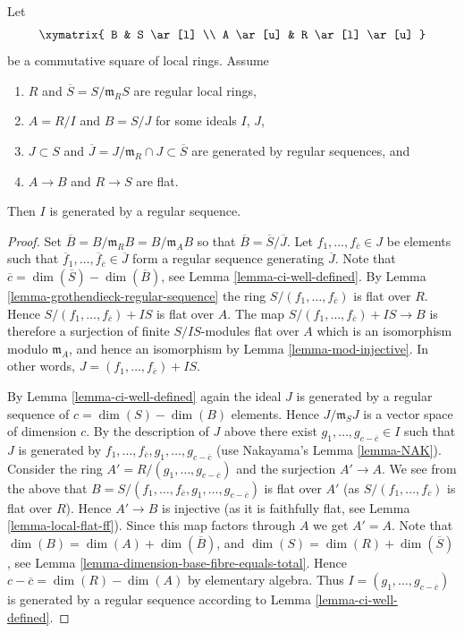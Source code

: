 \begin{lemma}
\label{lemma-lci-permanence-initial}
Let
$$
\xymatrix{
B & S \ar[l] \\
A \ar[u] & R \ar[l] \ar[u]
}
$$
be a commutative square of local rings. Assume
\begin{enumerate}
\item $R$ and $\overline{S} = S/\mathfrak m_R S$ are regular local rings,
\item $A = R/I$ and $B = S/J$ for some ideals $I$, $J$,
\item $J \subset S$ and
$\overline{J} = J/\mathfrak m_R \cap J \subset \overline{S}$
are generated by regular sequences, and
\item $A \to B$ and $R \to S$ are flat.
\end{enumerate}
Then $I$ is generated by a regular sequence.
\end{lemma}

\begin{proof}
Set $\overline{B} = B/\mathfrak m_RB = B/\mathfrak m_AB$ so that
$\overline{B} = \overline{S}/\overline{J}$.
Let $f_1, \ldots, f_{\overline{c}} \in J$ be elements such that
$\overline{f}_1, \ldots, \overline{f}_{\overline{c}} \in \overline{J}$
form a regular sequence generating $\overline{J}$.
Note that $\overline{c} = \dim(\overline{S}) - \dim(\overline{B})$,
see Lemma \ref{lemma-ci-well-defined}.
By Lemma \ref{lemma-grothendieck-regular-sequence}
the ring $S/(f_1, \ldots, f_{\overline{c}})$ is flat
over $R$. Hence $S/(f_1, \ldots, f_{\overline{c}}) + IS$ is flat over $A$.
The map $S/(f_1, \ldots, f_{\overline{c}}) + IS \to B$ is therefore a
surjection of finite $S/IS$-modules flat over $A$ which
is an isomorphism modulo $\mathfrak m_A$, and hence an
isomorphism by Lemma \ref{lemma-mod-injective}. In other words,
$J = (f_1, \ldots, f_{\overline{c}}) + IS$.

\medskip\noindent
By Lemma \ref{lemma-ci-well-defined} again the ideal $J$ is
generated by a regular sequence of $c = \dim(S) - \dim(B)$ elements. Hence
$J/\mathfrak m_SJ$ is a vector space of dimension $c$.
By the description of $J$ above there exist
$g_1, \ldots, g_{c - \overline{c}} \in I$ such that
$J$ is generated by
$f_1, \ldots, f_{\overline{c}}, g_1, \ldots, g_{c - \overline{c}}$
(use Nakayama's Lemma \ref{lemma-NAK}). Consider the ring
$A' = R/(g_1, \ldots, g_{c - \overline{c}})$ and the surjection
$A' \to A$. We see from the above that
$B = S/(f_1, \ldots, f_{\overline{c}}, g_1, \ldots, g_{c - \overline{c}})$
is flat over $A'$ (as $S/(f_1, \ldots, f_{\overline{c}})$ is flat
over $R$). Hence $A' \to B$ is injective (as it is faithfully flat,
see Lemma \ref{lemma-local-flat-ff}).
Since this map factors through $A$ we get $A' = A$.
Note that $\dim(B) = \dim(A) + \dim(\overline{B})$, and
$\dim(S) = \dim(R) + \dim(\overline{S})$, see
Lemma \ref{lemma-dimension-base-fibre-equals-total}.
Hence $c - \overline{c} = \dim(R) -\dim(A)$ by elementary algebra.
Thus $I = (g_1, \ldots, g_{c - \overline{c}})$ is generated
by a regular sequence according to Lemma \ref{lemma-ci-well-defined}.
\end{proof}






